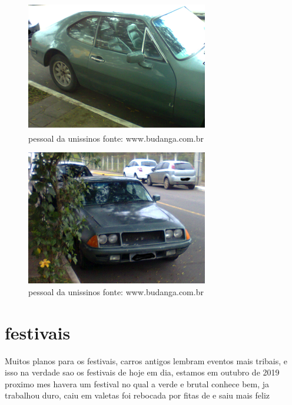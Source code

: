 \documentclass[a4paper]{report}
\begin{document}
\begin{figure}[!htb]
\centering
\includegraphics{Foto0296}
\caption{pessoal da unissinos fonte: www.budanga.com.br}
\label{fan clube SL }
\end{figure}


\begin{figure}[!htb]
\centering
\includegraphics{Foto0295}
\caption{pessoal da unissinos fonte: www.budanga.com.br}
\label{Blog do pessoal da Tecnosinos }
\end{figure}
\clearpage



\section*{festivais}
	Muitos planos para os festivais, carros antigos lembram eventos mais tribais, e isso na verdade sao os festivais de hoje em dia, 
        estamos em outubro de 2019 proximo mes havera um festival no qual a verde e brutal conhece bem, ja trabalhou duro, caiu em valetas
        foi rebocada por fitas de e saiu mais feliz 
\end{document}
